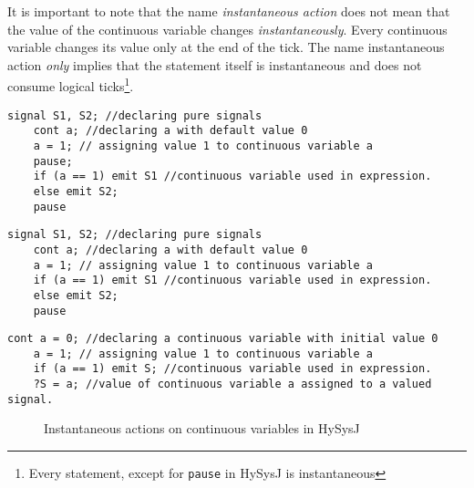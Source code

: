 \documentclass[10pt,journal,cspaper,compsoc]{IEEEtran}
\begin{document}
It is important to note that the name \textit{instantaneous action} does
not mean that the value of the continuous variable changes
\textit{instantaneously}. Every continuous variable changes its value
only at the end of the tick. The name instantaneous action \textit{only}
implies that the statement itself is instantaneous and does not consume
logical ticks\footnote{Every statement, except for \texttt{pause} in
  HySysJ is instantaneous}.

\newbox{\clfggg}
\begin{lrbox}{\clfggg}
  \begin{lstlisting}[mathescape,style=sysj,morekeywords={until,cont,signal,loop,abort,await,emit,present,trap,pause,exit,delay,suspend}]
    signal S1, S2; //declaring pure signals
    cont a; //declaring a with default value 0
    a = 1; // assigning value 1 to continuous variable a
    pause;
    if (a == 1) emit S1 //continuous variable used in expression.
    else emit S2;
    pause
  \end{lstlisting}
\end{lrbox}

\newbox{\clfgg}
\begin{lrbox}{\clfgg}
  \begin{lstlisting}[mathescape,style=sysj,morekeywords={until,cont,signal,loop,abort,await,emit,present,trap,pause,exit,delay,suspend}]
    signal S1, S2; //declaring pure signals
    cont a; //declaring a with default value 0
    a = 1; // assigning value 1 to continuous variable a
    if (a == 1) emit S1 //continuous variable used in expression.
    else emit S2;
    pause
  \end{lstlisting}
\end{lrbox}

\newbox{\clfg}
\begin{lrbox}{\clfg}
  \begin{lstlisting}[mathescape,style=sysj,morekeywords={until,cont,signal,loop,abort,await,emit,present,trap,pause,exit,delay,suspend}]
    cont a = 0; //declaring a continuous variable with initial value 0
    a = 1; // assigning value 1 to continuous variable a
    if (a == 1) emit S; //continuous variable used in expression.
    ?S = a; //value of continuous variable a assigned to a valued signal.
  \end{lstlisting}
\end{lrbox}

\begin{figure}[t!]
  \centering
  \usebox\clfg
  \caption{Instantaneous actions on continuous variables in HySysJ}
  \label{fig:15}
\end{figure}
\end{document}
